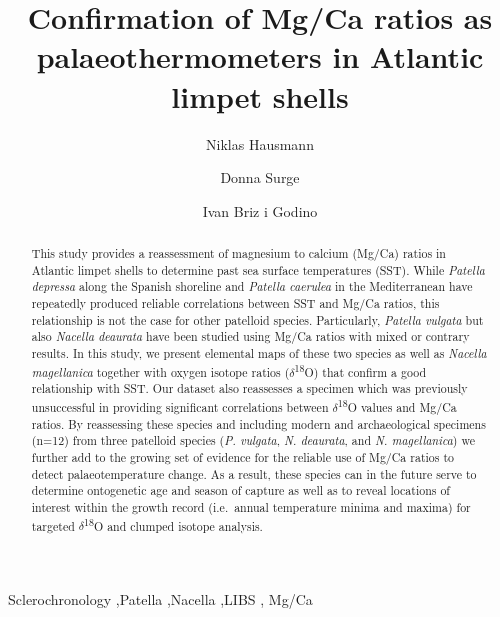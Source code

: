 \documentclass[
  authoryear,
  preprint,
  3p]{elsarticle}
\begin{document}
\begin{frontmatter}
\title{Confirmation of Mg/Ca ratios as palaeothermometers in Atlantic
limpet shells}
\author[1]{Niklas Hausmann%
%
}
\author[2]{Donna Surge%
%
}

\author[3]{Ivan Briz i Godino%
%
}






        
\begin{abstract}
This study provides a reassessment of magnesium to calcium (Mg/Ca)
ratios in Atlantic limpet shells to determine past sea surface
temperatures (SST). While \emph{Patella depressa} along the Spanish
shoreline and \emph{Patella caerulea} in the Mediterranean have
repeatedly produced reliable correlations between SST and Mg/Ca ratios,
this relationship is not the case for other patelloid species.
Particularly, \emph{Patella vulgata} but also \emph{Nacella deaurata}
have been studied using Mg/Ca ratios with mixed or contrary results. In
this study, we present elemental maps of these two species as well as
\emph{Nacella magellanica} together with oxygen isotope ratios
(\(\delta\)\textsuperscript{18}O) that confirm a good relationship with
SST. Our dataset also reassesses a specimen which was previously
unsuccessful in providing significant correlations between
\(\delta\)\textsuperscript{18}O values and Mg/Ca ratios. By reassessing
these species and including modern and archaeological specimens (n=12)
from three patelloid species (\emph{P. vulgata}, \emph{N. deaurata}, and
\emph{N. magellanica}) we further add to the growing set of evidence for
the reliable use of Mg/Ca ratios to detect palaeotemperature change. As
a result, these species can in the future serve to determine ontogenetic
age and season of capture as well as to reveal locations of interest
within the growth record (i.e.~annual temperature minima and maxima) for
targeted \(\delta\)\textsuperscript{18}O and clumped isotope analysis.
\end{abstract}





\begin{keyword}
    Sclerochronology \sep Patella \sep Nacella \sep LIBS \sep 
    Mg/Ca
\end{keyword}
\end{frontmatter}
    
\end{document}
